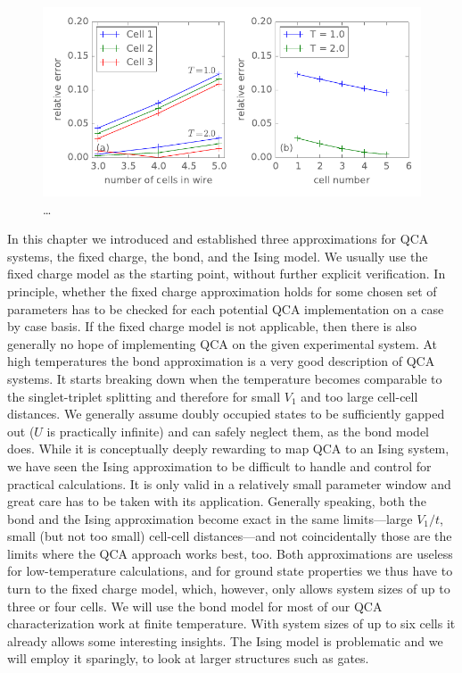 \begin{figure}
  \center
  \includegraphics{ising_approximation3}
  \caption{\ldots}
  \label{fig:ising_approximation3}
\end{figure}
%

In this chapter we introduced and established three approximations for QCA
systems, the fixed charge, the bond, and the Ising model. We usually use the
fixed charge model as the starting point, without further explicit verification.
In principle, whether the fixed charge approximation holds for some chosen set
of parameters has to be checked for each potential QCA implementation on a case
by case basis. If the fixed charge model is not applicable, then there is also
generally no hope of implementing QCA on the given experimental system. At high
temperatures the bond approximation is a very good description of QCA systems.
It starts breaking down when the temperature becomes comparable to the
singlet-triplet splitting and therefore for small $V_1$ and too large cell-cell
distances. We generally assume doubly occupied states to be sufficiently gapped
out ($U$ is practically infinite) and can safely neglect them, as the bond model
does. While it is conceptually deeply rewarding to map QCA to an Ising
system, we have seen the Ising approximation to be difficult to handle and control
for practical calculations. It is only valid in a relatively small parameter
window and great care has to be taken with its application. Generally speaking, both the
bond and the Ising approximation become exact in the same limits---large $V_1/t$,
small (but not too small) cell-cell distances---and not coincidentally those are
the limits where the QCA approach works best, too. Both approximations are
useless for low-temperature calculations, and for ground state properties we
thus have to turn to the fixed charge model, which, however, only allows system
sizes of up to three or four cells. We will use the bond model for most of our
QCA characterization work at finite temperature. With system sizes of up to six
cells it already allows some interesting insights. The Ising model is
problematic and we will employ it sparingly, to look at larger structures such
as gates.




